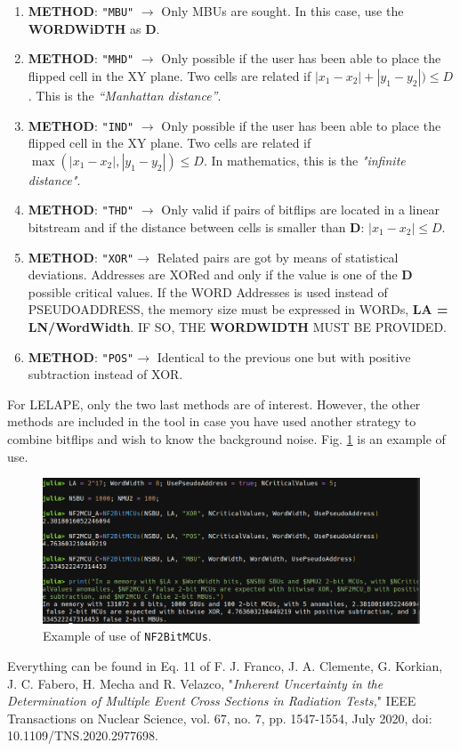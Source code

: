 \begin{itemize}
	\begin{enumerate}
		\item \textbf{METHOD}: \texttt{"MBU"} \(\rightarrow\) Only MBUs are sought. In this case, use the \textbf{WORDWiDTH} as \textbf{D}.
		\item \textbf{METHOD}: \texttt{"MHD"} \(\rightarrow\)  Only possible if the user has been able to place the flipped	cell in the XY plane. Two cells are related if \(\left|x_1-x_2\right|+ \left|y_1-y_2\right|) \le D\). This  is the \textit{``Manhattan distance''}.
		\item \textbf{METHOD}: \texttt{"IND"} \(\rightarrow\)  Only possible if the user has been able to place the flipped	cell in the XY plane. Two cells are related if \(\max(\left|x_1-x_2\right|, \left|y_1-y_2\right|) \le D\). In mathematics, this is the \textit{"infinite distance"}.
		\item \textbf{METHOD}: \texttt{"THD"} \(\rightarrow\)  Only valid if pairs of bitflips are located in a linear bitstream and if the
		distance between cells is smaller than \textbf{D}: \(\left|x_1-x_2\right| \le D\).
		\item \textbf{METHOD}: \texttt{"XOR"}\(\rightarrow\)  Related pairs are got by means of statistical deviations. Addresses are XORed 
		and only if the value is one of the \textbf{D} possible critical values. If the WORD Addresses  
		is used instead of PSEUDOADDRESS, the memory size must be expressed in WORDs, \textbf{LA = LN/WordWidth}.
		IF SO, THE \textbf{WORDWIDTH} MUST BE PROVIDED.
		\item \textbf{METHOD}: \texttt{"POS"}\(\rightarrow\)  Identical to the previous one but with positive subtraction instead of XOR.
	\end{enumerate}
	
	For LELAPE, only the two last methods are of interest. However, the other methods are included in the tool in case you have used another strategy to combine bitflips and wish to know the background noise. Fig. \ref{fig:Example_NF2BitMCUs} is an example of use.
	
	\begin{figure}[h!]
		\centering
		\includegraphics[width=0.75\columnwidth]{fig/functions/NF2BitMCUs.png}
		\caption{Example of use of \texttt{NF2BitMCUs}.}
		\label{fig:Example_NF2BitMCUs}
	\end{figure}	
	
	Everything can be found in Eq. 11 of F. J. Franco, J. A. Clemente, G. Korkian, 
	J. C. Fabero, H. Mecha and R. Velazco, "\textit{Inherent Uncertainty in the Determination of Multiple 
		Event Cross Sections in Radiation Tests,}" IEEE Transactions on Nuclear Science, vol. 67, no. 7, 
	pp. 1547-1554, July 2020, doi: 10.1109/TNS.2020.2977698.
	
\end{itemize}
%
